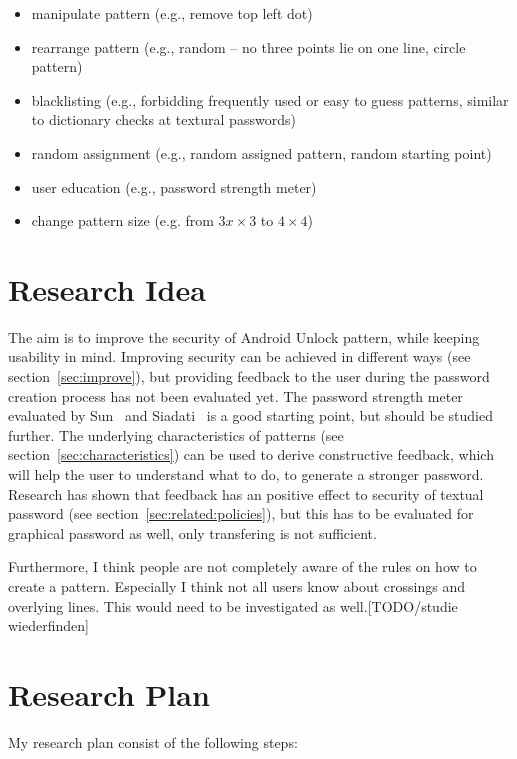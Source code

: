 \documentclass[twocolumn, a4paper, 10pt]{article}
\begin{document}
\begin{itemize}
	\item manipulate pattern (e.g., remove top left dot)
	\item rearrange pattern (e.g., random -- no three points lie on one line, circle pattern)
	\item blacklisting (e.g., forbidding frequently used or easy to guess patterns, similar to dictionary checks at textural passwords)
	\item random assignment (e.g., random assigned pattern, random starting point)
	\item user education (e.g., password strength meter)
	\item change pattern size (e.g. from $3x\times3$ to $4\times4$)
\end{itemize}

\section{Research Idea}
\label{sec:idea}
The aim is to improve the security of Android Unlock pattern, while keeping usability in mind. Improving security can be achieved in different ways (see section~\ref{sec:improve}), but providing feedback to the user during the password creation process has not been evaluated yet. The password strength meter evaluated by Sun~\cite{Sun2014308} and Siadati~\cite{siadati2015fortifying} is a good starting point, but should be studied further. The underlying characteristics of patterns (see section~\ref{sec:characteristics}) can be used to derive constructive feedback, which will help the user to understand what to do, to generate a stronger password. Research has shown that feedback has an positive effect to security of textual password (see section~\ref{sec:related:policies}), but this has to be evaluated for graphical password as well, only transfering is not sufficient.

Furthermore, I think people are not completely aware of the rules on how to create a pattern. Especially I think not all users know about crossings and overlying lines. This would need to be investigated as well.[TODO/studie wiederfinden]


\section{Research Plan}
\label{sec:plan}

My research plan consist of the following steps:\\
\end{document}
